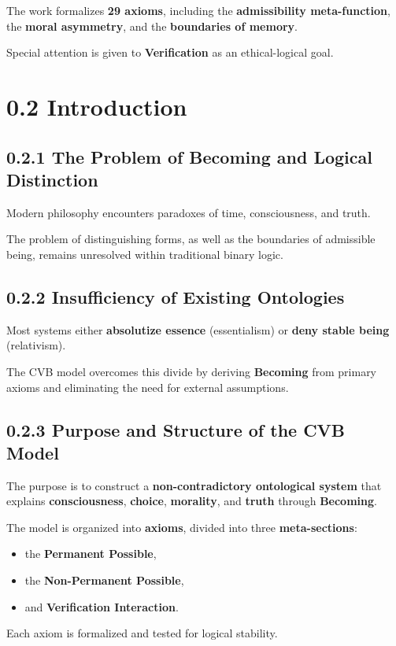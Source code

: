 \documentclass[12pt]{article}
\begin{document}
The work formalizes \textbf{29 axioms}, including the \textbf{admissibility meta-function}, the \textbf{moral asymmetry}, and the \textbf{boundaries of memory}.

Special attention is given to \textbf{Verification} as an ethical-logical goal.

\section*{0.2 Introduction}

\subsection*{0.2.1 The Problem of Becoming and Logical Distinction}
Modern philosophy encounters paradoxes of time, consciousness, and truth.

The problem of distinguishing forms, as well as the boundaries of admissible being, remains unresolved within traditional binary logic.

\subsection*{0.2.2 Insufficiency of Existing Ontologies}
Most systems either \textbf{absolutize essence} (essentialism) or \textbf{deny stable being} (relativism).

The CVB model overcomes this divide by deriving \textbf{Becoming} from primary axioms and eliminating the need for external assumptions.

\subsection*{0.2.3 Purpose and Structure of the CVB Model}
The purpose is to construct a \textbf{non-contradictory ontological system} that explains \textbf{consciousness}, \textbf{choice}, \textbf{morality}, and \textbf{truth} through \textbf{Becoming}.

The model is organized into \textbf{axioms}, divided into three \textbf{meta-sections}:

\begin{itemize}
\item the \textbf{Permanent Possible},
\item the \textbf{Non-Permanent Possible},
\item and \textbf{Verification Interaction}.
\end{itemize}

Each axiom is formalized and tested for logical stability.
\end{document}
